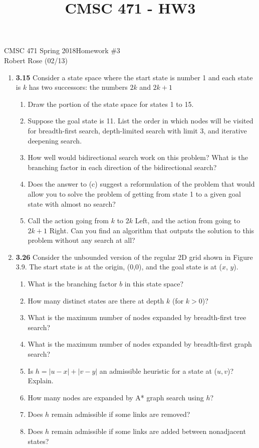 \documentclass[12pt]{article}
\title{CMSC 471 - HW3}
\begin{document}
CMSC 471 Spring 2018\hfill Homework \#3\\
Robert Rose (02/13)

\hrulefill

\begin{enumerate}
\item \textbf{3.15} Consider a state space where the start state is number 1 and each state is $k$ has two successors: the numbers $2k$ and $2k + 1$
  \begin{enumerate}
  \item Draw the portion of the state space for states 1 to 15.
  \item Suppose the goal state is 11. List the order in which nodes will be visited for breadth-first search, depth-limited search with limit 3, and iterative deepening search.
  \item How well would bidirectional search work on this problem? What is the branching factor in each direction of the bidirectional search?
  \item Does the answer to (c) suggest a reformulation of the problem that would allow you to solve the problem of getting from state 1 to a given goal state with almost no search?
  \item Call the action going from $k$ to $2k$ Left, and the action from going to $2k + 1$ Right. Can you find an algorithm that outputs the solution to this problem without any search at all?
  \end{enumerate}
\newpage

\item \textbf{3.26} Consider the unbounded version of the regular 2D grid shown in Figure 3.9. The start state is at the origin, (0,0), and the goal state is at ($x$, $y$).
  \begin{enumerate}
  \item What is the branching factor $b$ in this state space?
  \item How many distinct states are there at depth $k$ (for $k > 0$)?
  \item What is the maximum number of nodes expanded by breadth-first tree search?
  \item What is the maximum number of nodes expanded by breadth-first graph search?
  \item Is $h = \left|u - x\right| + \left|v - y\right|$ an admissible heuristic for a state at ($u, v$)? Explain.
  \item How many nodes are expanded by A* graph search using $h$?
  \item Does $h$ remain admissible if some links are removed?
  \item Does $h$ remain admissible if some links are added between nonadjacent states?
  \end{enumerate}

\end{enumerate}
\end{document}
